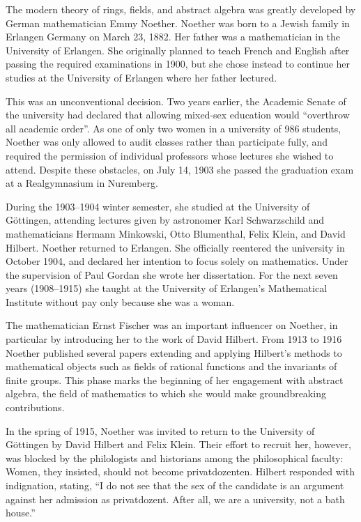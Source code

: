 \documentclass[b5paper]{article}
\begin{document}

The modern theory of rings, fields, and abstract algebra was greatly developed by German mathematician Emmy Noether. Noether was born to a Jewish family in Erlangen Germany on March 23, 1882. Her father was a mathematician in the University of Erlangen. She originally planned to teach French and English after passing the required examinations in 1900, but she chose instead to continue her studies at the University of Erlangen where her father lectured.

This was an unconventional decision. Two years earlier, the Academic Senate of the university had declared that allowing mixed-sex education would ``overthrow all academic order''. As one of only two women in a university of 986 students, Noether was only allowed to audit classes rather than participate fully, and required the permission of individual professors whose lectures she wished to attend. Despite these obstacles, on July 14, 1903 she passed the graduation exam at a Realgymnasium in Nuremberg.

During the 1903–1904 winter semester, she studied at the University of Göttingen, attending lectures given by astronomer Karl Schwarzschild and mathematicians Hermann Minkowski, Otto Blumenthal, Felix Klein, and David Hilbert. Noether returned to Erlangen. She officially reentered the university in October 1904, and declared her intention to focus solely on mathematics. Under the supervision of Paul Gordan she wrote her dissertation. For the next seven years (1908–1915) she taught at the University of Erlangen's Mathematical Institute without pay only because she was a woman.

The mathematician Ernst Fischer was an important influencer on Noether, in particular by introducing her to the work of David Hilbert. From 1913 to 1916 Noether published several papers extending and applying Hilbert's methods to mathematical objects such as fields of rational functions and the invariants of finite groups. This phase marks the beginning of her engagement with abstract algebra, the field of mathematics to which she would make groundbreaking contributions.

In the spring of 1915, Noether was invited to return to the University of Göttingen by David Hilbert and Felix Klein. Their effort to recruit her, however, was blocked by the philologists and historians among the philosophical faculty: Women, they insisted, should not become privatdozenten. Hilbert responded with indignation, stating, ``I do not see that the sex of the candidate is an argument against her admission as privatdozent. After all, we are a university, not a bath house.''
\end{document}
